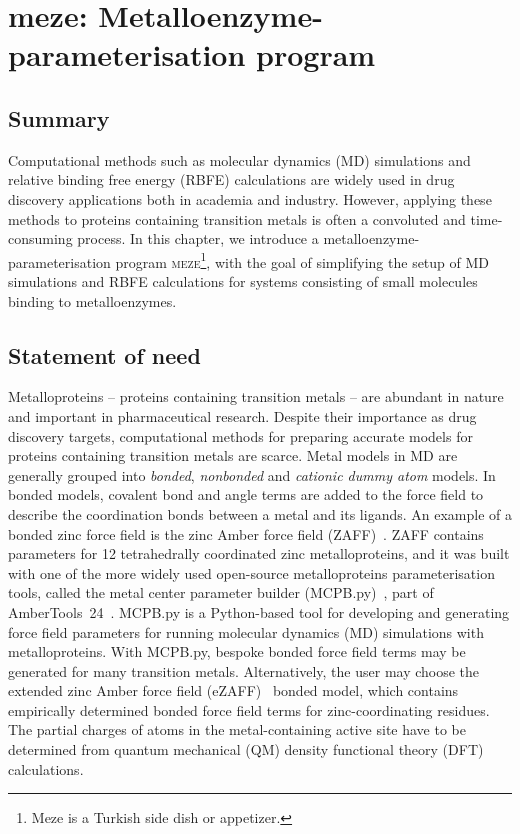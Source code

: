 \chapter{meze: Metalloenzyme-parameterisation program}\label{chapter:meze}

\section{Summary}

Computational methods such as molecular dynamics (MD) simulations and relative binding free energy (RBFE) calculations are widely used in drug discovery applications both in academia and industry. However, applying these methods to proteins containing transition metals is often a convoluted and time-consuming process. In this chapter, we introduce a metalloenzyme-parameterisation program \textsc{meze}\footnote[1]{Meze is a Turkish side dish or appetizer.}, with the goal of simplifying the setup of MD simulations and RBFE calculations for systems consisting of small molecules binding to metalloenzymes.

\section{Statement of need}

Metalloproteins -- proteins containing transition metals -- are abundant in nature and important in pharmaceutical research. Despite their importance as drug discovery targets, computational methods for preparing accurate models for proteins containing transition metals are scarce. Metal models in MD are generally grouped into \textit{bonded}, \textit{nonbonded} and \textit{cationic dummy atom} models. In bonded models, covalent bond and angle terms are added to the force field to describe the coordination bonds between a metal and its ligands. An example of a bonded zinc force field is the zinc Amber force field (ZAFF)~\cite{peters_structural_2010}. ZAFF contains parameters for 12 tetrahedrally coordinated zinc metalloproteins, and it was built with one of the more widely used open-source metalloproteins parameterisation tools, called the metal center parameter builder (MCPB.py)~\cite{li_mcpbpy_2016}, part of AmberTools~24~\cite{case_ambertools_2023}. MCPB.py is a Python-based tool for developing and generating force field parameters for running molecular dynamics (MD) simulations with metalloproteins. With MCPB.py, bespoke bonded force field terms may be generated for many transition metals. Alternatively, the user may choose the extended zinc Amber force field (eZAFF)~\cite{yu_extended_2018} bonded model, which contains empirically determined bonded force field terms for zinc-coordinating residues. The partial charges of atoms in the metal-containing active site have to be determined from quantum mechanical (QM) density functional theory (DFT) calculations. 

